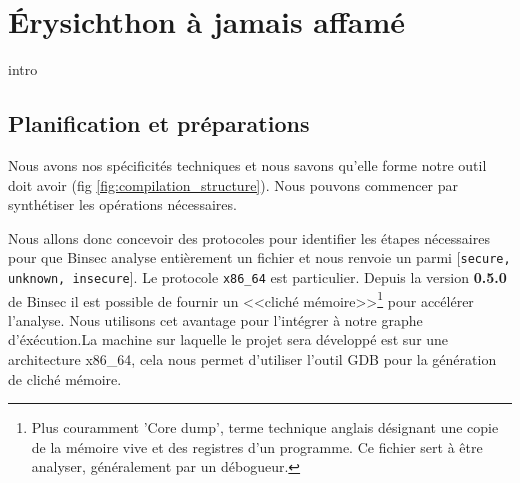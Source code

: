 \chapter{Érysichthon à jamais affamé}
\label{chap:erysichtonUsage}

intro


\section{Planification et préparations}

Nous avons nos spécificités techniques et nous savons qu'elle forme notre outil doit avoir (fig \ref{fig:compilation_structure}). Nous pouvons commencer par synthétiser les opérations nécessaires.\smallbreak

Nous allons donc concevoir des protocoles pour identifier les étapes nécessaires pour que Binsec analyse entièrement un fichier et nous renvoie un parmi [\texttt{secure, unknown, insecure}]. Le protocole \texttt{x86\_64} est particulier. Depuis la version \textbf{0.5.0} de Binsec il est possible de fournir un <<cliché mémoire>>\footnote{Plus couramment 'Core dump', terme technique anglais désignant une copie de la mémoire vive et des registres d'un programme. Ce fichier sert à être analyser, généralement par un débogueur.} pour accélérer l'analyse. Nous utilisons cet avantage pour l'intégrer à notre graphe d'éxécution.La machine sur laquelle le projet sera développé est sur une architecture x86\_64, cela nous permet d'utiliser l'outil GDB pour la génération de cliché mémoire.\medbreak

